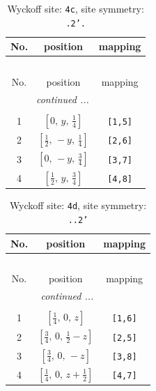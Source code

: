\documentclass[fleqn,8pt]{jsarticle}
\begin{document}
\renewcommand{\arraystretch}{1.2}
\begin{longtable}{ccc}
\caption{Wyckoff site: {\tt 4c}, site symmetry: {\tt .2'.}}
 \\
 \hline \hline
No. & position & mapping \\ \hline \endfirsthead

\multicolumn{2}{l}{\tablename\ \thetable{}} \\
 \hline \hline
No. & position & mapping \\ \hline \endhead

 \hline \hline
\multicolumn{2}{r}{\footnotesize\it continued ...} \\ \endfoot

 \hline \hline
\multicolumn{2}{r}{} \\ \endlastfoot

1 & $\left[ 0,\, y,\, \frac{1}{4} \right]$ & {\tt [1,5]} \\ \hline
2 & $\left[ \frac{1}{2},\, - y,\, \frac{1}{4} \right]$ & {\tt [2,6]} \\ \hline
3 & $\left[ 0,\, - y,\, \frac{3}{4} \right]$ & {\tt [3,7]} \\ \hline
4 & $\left[ \frac{1}{2},\, y,\, \frac{3}{4} \right]$ & {\tt [4,8]} \\
\end{longtable}
\renewcommand{\arraystretch}{1.2}
\begin{longtable}{ccc}
\caption{Wyckoff site: {\tt 4d}, site symmetry: {\tt ..2'}}
 \\
 \hline \hline
No. & position & mapping \\ \hline \endfirsthead

\multicolumn{2}{l}{\tablename\ \thetable{}} \\
 \hline \hline
No. & position & mapping \\ \hline \endhead

 \hline \hline
\multicolumn{2}{r}{\footnotesize\it continued ...} \\ \endfoot

 \hline \hline
\multicolumn{2}{r}{} \\ \endlastfoot

1 & $\left[ \frac{1}{4},\, 0,\, z \right]$ & {\tt [1,6]} \\ \hline
2 & $\left[ \frac{3}{4},\, 0,\, \frac{1}{2} - z \right]$ & {\tt [2,5]} \\ \hline
3 & $\left[ \frac{3}{4},\, 0,\, - z \right]$ & {\tt [3,8]} \\ \hline
4 & $\left[ \frac{1}{4},\, 0,\, z + \frac{1}{2} \right]$ & {\tt [4,7]} \\
\end{longtable}
\end{document}
